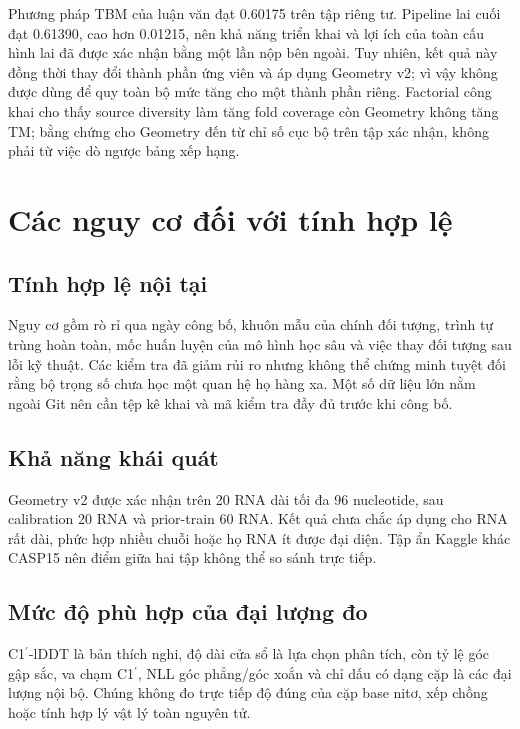 \documentclass[12pt,a4paper,oneside]{report}
\newcommand{\cprime}{C1$^{\prime}$}
\begin{document}
Phương pháp TBM của luận văn đạt 0.60175 trên tập riêng tư. Pipeline lai cuối
đạt 0.61390, cao hơn 0.01215, nên khả năng triển khai và lợi ích của toàn cấu hình lai đã
được xác nhận bằng một lần nộp bên ngoài. Tuy nhiên, kết quả này đồng thời thay đổi thành
phần ứng viên và áp dụng Geometry v2; vì vậy không được dùng để quy toàn bộ mức tăng cho
một thành phần riêng. Factorial công khai cho thấy source diversity làm tăng fold
coverage còn Geometry không tăng TM; bằng chứng cho Geometry đến từ chỉ số cục bộ trên
tập xác nhận, không phải từ việc dò ngược bảng xếp hạng.

\section{Các nguy cơ đối với tính hợp lệ}

\subsection{Tính hợp lệ nội tại}

Nguy cơ gồm rò rỉ qua ngày công bố, khuôn mẫu của chính đối tượng, trình tự trùng hoàn
toàn, mốc huấn luyện của mô hình học sâu và việc thay đối tượng sau lỗi kỹ thuật. Các
kiểm tra đã giảm rủi ro nhưng không thể chứng minh tuyệt đối rằng bộ trọng số chưa học
một quan hệ họ hàng xa. Một số dữ liệu lớn nằm ngoài Git nên cần tệp kê khai và mã kiểm tra
đầy đủ trước khi công bố.

\subsection{Khả năng khái quát}

Geometry v2 được xác nhận trên 20 RNA dài tối đa 96 nucleotide, sau calibration 20 RNA
và prior-train 60 RNA. Kết quả chưa chắc áp dụng cho RNA rất dài, phức hợp nhiều chuỗi
hoặc họ RNA ít được đại diện. Tập ẩn Kaggle khác CASP15 nên điểm giữa hai tập không thể
so sánh trực tiếp.

\subsection{Mức độ phù hợp của đại lượng đo}

\cprime{}-lDDT là bản thích nghi, độ dài cửa sổ là lựa chọn phân tích, còn tỷ lệ góc gập
sắc, va chạm \cprime{}, NLL góc phẳng/góc xoắn và chỉ dấu có dạng cặp là các đại lượng
nội bộ. Chúng không đo trực tiếp độ đúng của cặp base nitơ, xếp chồng hoặc tính hợp lý vật lý toàn nguyên tử.
\end{document}
